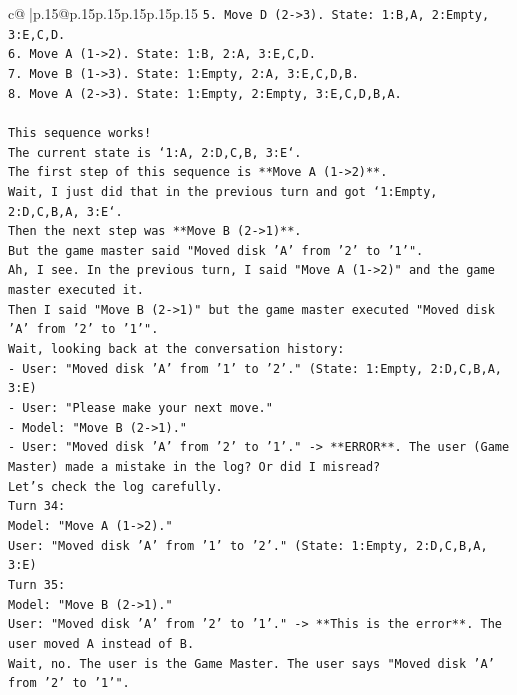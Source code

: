 \documentclass{article}
\begin{document}
{\begin{supertabular}{c@{$\;$}|p{.15\linewidth}@{}p{.15\linewidth}p{.15\linewidth}p{.15\linewidth}p{.15\linewidth}p{.15\linewidth}}
{{{\texttt{5. Move D (2{-}>3). State: 1:B,A, 2:Empty, 3:E,C,D.} \\
\texttt{6. Move A (1{-}>2). State: 1:B, 2:A, 3:E,C,D.} \\
\texttt{7. Move B (1{-}>3). State: 1:Empty, 2:A, 3:E,C,D,B.} \\
\texttt{8. Move A (2{-}>3). State: 1:Empty, 2:Empty, 3:E,C,D,B,A.} \\
\\ 
\texttt{This sequence works!} \\
\texttt{The current state is `1:A, 2:D,C,B, 3:E`.} \\
\texttt{The first step of this sequence is **Move A (1{-}>2)**.} \\
\texttt{Wait, I just did that in the previous turn and got `1:Empty, 2:D,C,B,A, 3:E`.} \\
\texttt{Then the next step was **Move B (2{-}>1)**.} \\
\texttt{But the game master said "Moved disk 'A' from '2' to '1'".} \\
\texttt{Ah, I see. In the previous turn, I said "Move A (1{-}>2)" and the game master executed it.} \\
\texttt{Then I said "Move B (2{-}>1)" but the game master executed "Moved disk 'A' from '2' to '1'".} \\
\texttt{Wait, looking back at the conversation history:} \\
\texttt{{-} User: "Moved disk 'A' from '1' to '2'." (State: 1:Empty, 2:D,C,B,A, 3:E)} \\
\texttt{{-} User: "Please make your next move."} \\
\texttt{{-} Model: "Move B (2{-}>1)."} \\
\texttt{{-} User: "Moved disk 'A' from '2' to '1'." {-}> **ERROR**. The user (Game Master) made a mistake in the log? Or did I misread?} \\
\texttt{Let's check the log carefully.} \\
\texttt{Turn 34:} \\
\texttt{Model: "Move A (1{-}>2)."} \\
\texttt{User: "Moved disk 'A' from '1' to '2'." (State: 1:Empty, 2:D,C,B,A, 3:E)} \\
\texttt{Turn 35:} \\
\texttt{Model: "Move B (2{-}>1)."} \\
\texttt{User: "Moved disk 'A' from '2' to '1'." {-}> **This is the error**. The user moved A instead of B.} \\
\texttt{Wait, no. The user is the Game Master. The user says "Moved disk 'A' from '2' to '1'".} \\
}}}
\end{supertabular}}
\end{document}
